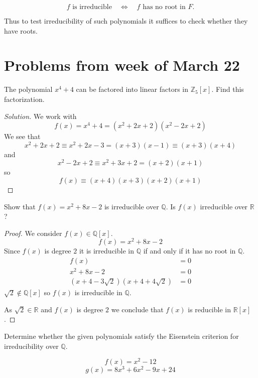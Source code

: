 \[
f \text{ is irreducible}
\quad \Longleftrightarrow \quad
f \text{ has no root in } F.
\]

Thus to test irreducibility of such polynomials it suffices
to check whether they have roots.

\newpage 
\section{Problems from week of March 22}
\begin{prob}
    The polynomial $x^4 + 4$ can be factored into linear 
    factors in $\mathbb Z_5[x]$. Find this factorization.
\end{prob}
\begin{proof}[Solution]
    We work with 
    \[
        f(x) = x^4 + 4 = (x^2 + 2x + 2)(x^2 - 2x + 2)
    \]
    We see that 
    \[
        x^2 + 2x + 2 \equiv x^2 + 2x - 3 = (x+3)(x-1) \equiv 
        (x+3)(x+4) 
    \]
    and 
    \[
        x^2 - 2x + 2 \equiv x^2 + 3x + 2 = (x+2)(x+1)
    \]
    so 
    \[
        f(x) \equiv (x+4)(x+3)(x+2)(x+1) 
    \]
\end{proof}
\begin{prob}
    Show that $f(x) = x^2 + 8x - 2$ is irreducible over 
    $\mathbb Q$. Is $f(x)$ irreducible over $\mathbb R$?
\end{prob}
\begin{proof}
    We consider $f(x) \in \mathbb Q[x]$.
    \[
        f(x) = x^2 + 8x - 2 
    \]
    Since $f(x)$ is degree $2$ it is irreducible in $\mathbb Q$ 
    if and only if 
    it has no root in $\mathbb Q$. 
    \begin{align*}
        f(x) &= 0 \\ 
        x^2 + 8x - 2 &= 0 \\ 
        (x+4-3\sqrt{2})(x+4+4\sqrt 2) &= 0
    \end{align*}
    $\sqrt 2 \not \in \mathbb Q[x]$ so $f(x)$ is irreducible in 
    $\mathbb Q$. 

    As $\sqrt 2 \in \mathbb R$ and $f(x)$ is degree $2$ we conclude 
    that $f(x)$ is reducible in $\mathbb R[x]$. 
\end{proof}
\begin{prob}
    Determine whether the given polynomials satisfy the Eisenstein
    criterion for irreducibility over $\mathbb Q$. 

    \[
        f(x) = x^2-12
    \]
    \[
        g(x) = 8x^3 + 6x^2 -9x + 24
    \]
\end{prob}
